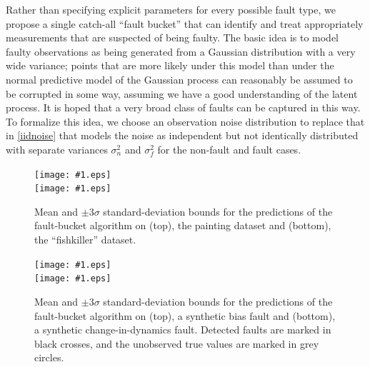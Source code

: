 \documentclass{article}
\newcommand{\psff}[1]{\texttt{[image: \#1.eps]}}
\begin{document}
Rather than specifying explicit parameters for every possible fault
type, we propose a single catch-all ``fault bucket'' that can identify
and treat appropriately measurements that are suspected of being
faulty.  The basic idea is to model faulty observations as being
generated from a Gaussian distribution with a very wide variance;
points that are more likely under this model than under the normal
predictive model of the Gaussian process can reasonably be assumed to
be corrupted in some way, assuming we have a good understanding of the
latent process. It is hoped that a very broad class of faults can be
captured in this way. To formalize this idea, we choose an observation noise distribution to
replace that in \eqref{iidnoise} that models the noise as independent
but not identically distributed with separate variances $\sigma_n^2$ and $\sigma_f^2$ for the
non-fault and fault cases.

\begin{figure}
  \centering
  \small
  \psff{painting_big} \\
  \psff{fishkiller}
  \caption{Mean and $\pm3\sigma$ standard-deviation bounds for the
    predictions of the fault-bucket algorithm on (top), the painting
    dataset and (bottom), the ``fishkiller'' dataset.}
  \label{justfb}
\end{figure}

\begin{figure}
  \centering
  \small
  \psff{bias} \\
  \psff{dynamics}
  \caption{Mean and $\pm3\sigma$ standard-deviation bounds for the
    predictions of the fault-bucket algorithm on (top), a synthetic
    bias fault and (bottom), a synthetic change-in-dynamics fault.
    Detected faults are marked in black crosses, and the unobserved
    true values are marked in grey circles.}
  \label{synthetic}
\end{figure}

\end{document}
